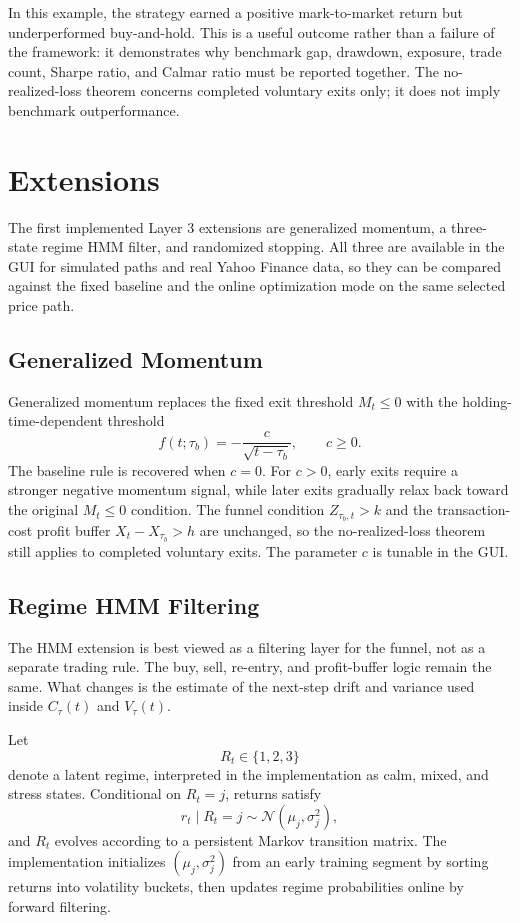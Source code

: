 \documentclass[11pt]{article}
\begin{document}
In this example, the strategy earned a positive mark-to-market return but underperformed buy-and-hold. This is a useful outcome rather than a failure of the framework: it demonstrates why benchmark gap, drawdown, exposure, trade count, Sharpe ratio, and Calmar ratio must be reported together. The no-realized-loss theorem concerns completed voluntary exits only; it does not imply benchmark outperformance.

\section{Extensions}

The first implemented Layer 3 extensions are generalized momentum, a
three-state regime HMM filter, and randomized stopping. All three are available
in the GUI for simulated paths and real Yahoo Finance data, so they can be
compared against the fixed baseline and the online optimization mode on the
same selected price path.

\subsection{Generalized Momentum}

Generalized momentum replaces the fixed exit threshold \(M_t\leq 0\) with the
holding-time-dependent threshold
\[
f(t;\tau_b)
=
-\frac{c}{\sqrt{t-\tau_b}},
\qquad c\geq 0.
\]
The baseline rule is recovered when \(c=0\). For \(c>0\), early exits require a
stronger negative momentum signal, while later exits gradually relax back
toward the original \(M_t\leq 0\) condition. The funnel condition
\(Z_{\tau_b,t}>k\) and the transaction-cost profit buffer
\(X_t-X_{\tau_b}>h\) are unchanged, so the no-realized-loss theorem still
applies to completed voluntary exits. The parameter \(c\) is tunable in the
GUI.

\subsection{Regime HMM Filtering}

The HMM extension is best viewed as a filtering layer for the funnel, not as a
separate trading rule. The buy, sell, re-entry, and profit-buffer logic remain
the same. What changes is the estimate of the next-step drift and variance used
inside \(C_\tau(t)\) and \(V_\tau(t)\).

Let
\[
R_t\in\{1,2,3\}
\]
denote a latent regime, interpreted in the implementation as calm, mixed, and
stress states. Conditional on \(R_t=j\), returns satisfy
\[
r_t\mid R_t=j\sim\mathcal N(\mu_j,\sigma_j^2),
\]
and \(R_t\) evolves according to a persistent Markov transition matrix. The
implementation initializes \((\mu_j,\sigma_j^2)\) from an early training segment
by sorting returns into volatility buckets, then updates regime probabilities
online by forward filtering.
\end{document}
